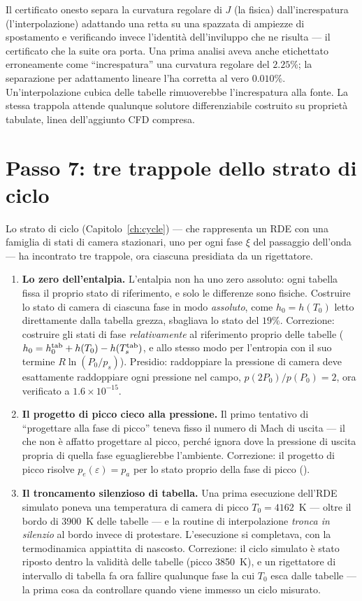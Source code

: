 Il certificato onesto separa la curvatura regolare di $J$ (la fisica)
dall'increspatura (l'interpolazione) adattando una retta su una
spazzata di ampiezze di spostamento e verificando invece l'identità
dell'inviluppo che ne risulta --- il certificato che la suite ora
porta. Una prima analisi aveva anche etichettato erroneamente come
``increspatura'' una curvatura regolare del $2.25\%$; la separazione
per adattamento lineare l'ha corretta al vero $0.010\%$.
Un'interpolazione cubica delle tabelle rimuoverebbe l'increspatura
alla fonte. La stessa trappola attende qualunque solutore
differenziabile costruito su proprietà tabulate, linea dell'aggiunto
CFD compresa.

\section{Passo 7: tre trappole dello strato di ciclo}
\label{app:cycletraps}

Lo strato di ciclo (Capitolo~\ref{ch:cycle}) --- che rappresenta un
RDE con una famiglia di stati di camera stazionari, uno per ogni fase
$\xi$ del passaggio dell'onda --- ha incontrato tre trappole, ora
ciascuna presidiata da un rigettatore.

\begin{enumerate}[itemsep=2pt]
\item \textbf{Lo zero dell'entalpia.} L'entalpia non ha uno zero
  assoluto: ogni tabella fissa il proprio stato di riferimento, e solo
  le differenze sono fisiche. Costruire lo stato di camera di ciascuna
  fase in modo \emph{assoluto}, come $h_0 = h(T_0)$ letto direttamente
  dalla tabella grezza, sbagliava lo stato del $19\%$. Correzione:
  costruire gli stati di fase \emph{relativamente} al riferimento
  proprio delle tabelle
  ($h_0 = h_0^{\rm tab} + h(T_0) - h(T_s^{\rm tab})$, e allo stesso
  modo per l'entropia con il suo termine $R\ln(P_0/p_s)$). Presidio:
  raddoppiare la pressione di camera deve esattamente raddoppiare ogni
  pressione nel campo, $p(2P_0)/p(P_0) = 2$, ora verificato a
  $1.6\times10^{-15}$.
\item \textbf{Il progetto di picco cieco alla pressione.} Il primo
  tentativo di ``progettare alla fase di picco'' teneva fisso il
  numero di Mach di uscita --- il che non è affatto progettare al
  picco, perché ignora dove la pressione di uscita propria di quella
  fase eguaglierebbe l'ambiente. Correzione: il progetto di picco
  risolve $p_e(\varepsilon) = p_a$ per lo stato proprio della fase di
  picco ().
\item \textbf{Il troncamento silenzioso di tabella.} Una prima
  esecuzione dell'RDE simulato poneva una temperatura di camera di
  picco $T_0 = 4162$~K --- oltre il bordo di 3900~K delle tabelle ---
  e la routine di interpolazione  \emph{tronca in
  silenzio} al bordo invece di protestare. L'esecuzione si completava,
  con la termodinamica appiattita di nascosto. Correzione: il ciclo
  simulato è stato riposto dentro la validità delle tabelle (picco
  3850~K), e un rigettatore di intervallo di tabella fa ora fallire
  qualunque fase la cui $T_0$ esca dalle tabelle --- la prima cosa da
  controllare quando viene immesso un ciclo misurato.
\end{enumerate}


